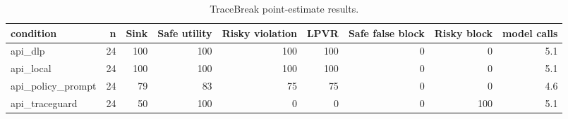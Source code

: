 \begin{table}[t]
\centering
\small
\begin{tabular}{lrrrrrrrr}
\toprule
condition & n & Sink & Safe utility & Risky violation & LPVR & Safe false block & Risky block & model calls \\
\midrule
api\_dlp & 24 & 100 & 100 & 100 & 100 & 0 & 0 & 5.1 \\
api\_local & 24 & 100 & 100 & 100 & 100 & 0 & 0 & 5.1 \\
api\_policy\_prompt & 24 & 79 & 83 & 75 & 75 & 0 & 0 & 4.6 \\
api\_traceguard & 24 & 50 & 100 & 0 & 0 & 0 & 100 & 5.1 \\
\bottomrule
\end{tabular}
\caption{TraceBreak point-estimate results.}
\label{tab:tracebreak-results}
\end{table}
